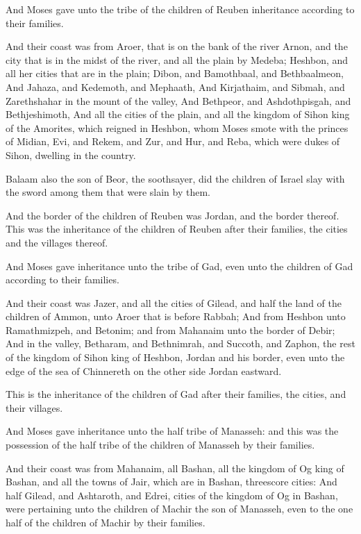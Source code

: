 \verse And Moses gave unto the tribe of the children of Reuben inheritance according to their families.

\verse And their coast was from Aroer, that is on the bank of the river Arnon, and the city that is in the midst of the river, and all the plain by Medeba; \verse Heshbon, and all her cities that are in the plain; Dibon, and Bamothbaal, and Bethbaalmeon, \verse And Jahaza, and Kedemoth, and Mephaath, \verse And Kirjathaim, and Sibmah, and Zarethshahar in the mount of the valley, \verse And Bethpeor, and Ashdothpisgah, and Bethjeshimoth, \verse And all the cities of the plain, and all the kingdom of Sihon king of the Amorites, which reigned in Heshbon, whom Moses smote with the princes of Midian, Evi, and Rekem, and Zur, and Hur, and Reba, which were dukes of Sihon, dwelling in the country.

\verse Balaam also the son of Beor, the soothsayer, did the children of Israel slay with the sword among them that were slain by them.

\verse And the border of the children of Reuben was Jordan, and the border thereof. This was the inheritance of the children of Reuben after their families, the cities and the villages thereof.

\verse And Moses gave inheritance unto the tribe of Gad, even unto the children of Gad according to their families.

\verse And their coast was Jazer, and all the cities of Gilead, and half the land of the children of Ammon, unto Aroer that is before Rabbah; \verse And from Heshbon unto Ramathmizpeh, and Betonim; and from Mahanaim unto the border of Debir; \verse And in the valley, Betharam, and Bethnimrah, and Succoth, and Zaphon, the rest of the kingdom of Sihon king of Heshbon, Jordan and his border, even unto the edge of the sea of Chinnereth on the other side Jordan eastward.

\verse This is the inheritance of the children of Gad after their families, the cities, and their villages.

\verse And Moses gave inheritance unto the half tribe of Manasseh: and this was the possession of the half tribe of the children of Manasseh by their families.

\verse And their coast was from Mahanaim, all Bashan, all the kingdom of Og king of Bashan, and all the towns of Jair, which are in Bashan, threescore cities: \verse And half Gilead, and Ashtaroth, and Edrei, cities of the kingdom of Og in Bashan, were pertaining unto the children of Machir the son of Manasseh, even to the one half of the children of Machir by their families.

